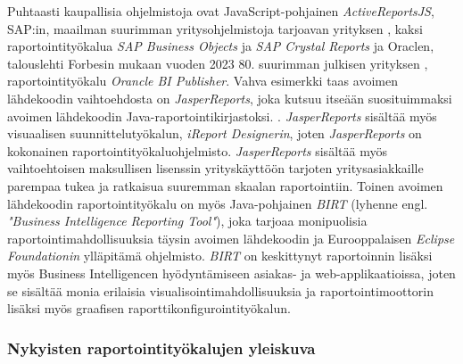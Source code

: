 Puhtaasti kaupallisia ohjelmistoja ovat JavaScript-pohjainen \textit{ActiveReportsJS}, SAP:in, maailman suurimman yritysohjelmistoja tarjoavan yrityksen \cite{noauthor_sap_nodate-3}, kaksi raportointityökalua \textit{SAP Business Objects} ja \textit{SAP Crystal Reports} ja Oraclen, talouslehti Forbesin mukaan vuoden 2023 80. suurimman julkisen yrityksen \cite{tucker_global_nodate}, raportointityökalu \textit{Orancle BI Publisher}. Vahva esimerkki taas avoimen lähdekoodin vaihtoehdosta on \textit{JasperReports}, joka kutsuu itseään suosituimmaksi avoimen lähdekoodin Java-raportointikirjastoksi. \cite{noauthor_jasperreports_nodate}. \textit{JasperReports} sisältää myös visuaalisen suunnittelutyökalun, \textit{iReport Designerin}, joten \textit{JasperReports} on kokonainen raportointityökaluohjelmisto. \textit{JasperReports} sisältää myös vaihtoehtoisen maksullisen lisenssin yrityskäyttöön tarjoten yritysasiakkaille parempaa tukea ja ratkaisua suuremman skaalan raportointiin. \cite{noauthor_jasper_nodate} Toinen avoimen lähdekoodin raportointityökalu on myös Java-pohjainen \textit{BIRT} (lyhenne engl. \textit{"Business Intelligence Reporting Tool"}), joka tarjoaa monipuolisia raportointimahdollisuuksia täysin avoimen lähdekoodin ja Eurooppalaisen \textit{Eclipse Foundationin} ylläpitämä ohjelmisto. \cite{eclipsebirtBIRT} \textit{BIRT} on keskittynyt raportoinnin lisäksi myös Business Intelligencen hyödyntämiseen asiakas- ja web-applikaatioissa, joten se sisältää monia erilaisia visualisointimahdollisuuksia ja raportointimoottorin lisäksi myös graafisen raporttikonfigurointityökalun.

\subsubsection{Nykyisten raportointityökalujen yleiskuva} \label{Nykyisten yleiskuva}

